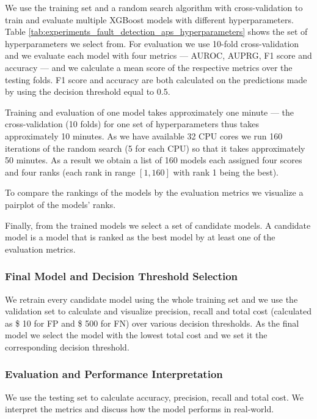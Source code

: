 We use the training set and a random search algorithm with cross-validation to train and evaluate multiple XGBoost models with different hyperparameters.
Table \ref{tab:experiments_fault_detection_aps_hyperparameters} shows the set of hyperparameters we select from.
For evaluation we use 10-fold cross-validation and we evaluate each model with four metrics --- AUROC, AUPRG, F1 score and accuracy --- and we calculate a mean score of the respective metrics over the testing folds.
F1 score and accuracy are both calculated on the predictions made by using the decision threshold equal to 0.5.

Training and evaluation of one model takes approximately one minute --- the cross-validation (10 folds) for one set of hyperparameters thus takes approximately 10 minutes.
As we have available 32 CPU cores we run 160 iterations of the random search (5 for each CPU) so that it takes approximately 50 minutes.
As a result we obtain a list of 160 models each assigned four scores and four ranks (each rank in range $[1, 160]$ with rank 1 being the best).

To compare the rankings of the models by the evaluation metrics we visualize a pairplot of the models' ranks.

Finally, from the trained models we select a set of candidate models.
A candidate model is a model that is ranked as the best model by at least one of the evaluation metrics.

\subsubsection{Final Model and Decision Threshold Selection}

We retrain every candidate model using the whole training set and we use the validation set to calculate and visualize precision, recall and total cost (calculated as \$ 10 for FP and \$ 500 for FN) over various decision thresholds.
As the final model we select the model with the lowest total cost and we set it the corresponding decision threshold.

\subsubsection{Evaluation and Performance Interpretation}

We use the testing set to calculate accuracy, precision, recall and total cost.
We interpret the metrics and discuss how the model performs in real-world.

